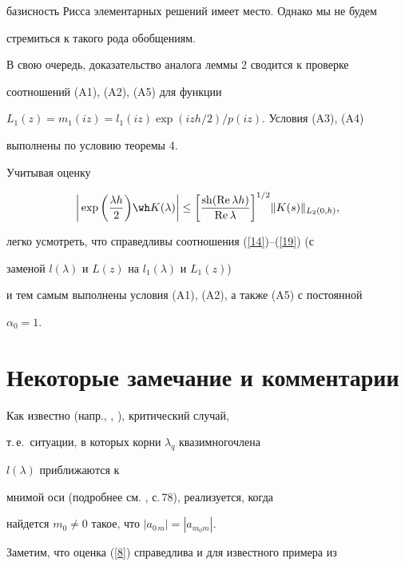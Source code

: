 базисность Рисса элементарных решений имеет место. Однако мы не будем 


стремиться к такого рода обобщениям. 


 


В свою очередь, доказательство аналога леммы 2 сводится к проверке 


соотношений (A1), (A2), (A5) для функции 


$L_1(z)=m_1(iz)=l_1(iz)\exp(izh/2)/p(iz)$. Условия (A3), (A4) 


выполнены по условию теоремы 4. 


 


Учитывая оценку


$$ 


\bigg|\exp\bigg(\frac{\lambda h}{2}\bigg)\wh K(\lambda)\bigg|\le 


\bigg[\frac{\Sh(\re\lambda h)}{\re\lambda}\bigg]^{1/2} 


\|K(s)\|_{L_2(0,h)}, 


$$ 


легко усмотреть, что справедливы соотношения (\ref{14})--(\ref{19}) (с 


заменой $l(\lambda)$ и $L(z)$ на $l_1(\lambda)$ и $L_1(z)$) 


и тем самым выполнены условия (A1), (A2), а также (A5) с постоянной 


$\alpha_0=1$. 


 


\section{Некоторые замечание и комментарии} 


 


Как известно (напр., \cite{11}, \cite{12}), критический случай, 


т.\,е.~ситуации, в которых корни $\lambda_q$ квазимногочлена 


$l(\lambda)$ приближаются к 


мнимой оси (подробнее см. \cite{11}, с.\,78), реализуется, когда 


найдется $m_0\ne 0$ такое, что $|a_{0\,m}|=|a_{m_0m}|$. 


 


Заметим, что оценка (\ref{8}) справедлива и для известного примера из 


